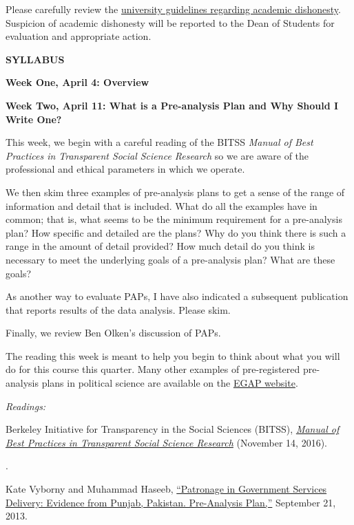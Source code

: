 \documentclass[11pt]{article}
\begin{document}
Please carefully review the \href{http://www.deanofstudents.ucla.edu/Portals/16/Documents/StudentGuide.pdf}{university guidelines regarding academic dishonesty}. 
Suspicion of academic dishonesty will be reported to the Dean of Students for evaluation and appropriate action.


\newpage
\centerline{\textbf{SYLLABUS}}


\textbf{Week One, April 4: Overview}

\textbf{Week Two, April 11: What is a Pre-analysis Plan and Why Should I Write One?}

This week, we begin with a careful reading of the BITSS \emph{Manual of Best Practices in Transparent Social Science Research} so we
are aware of the professional and ethical parameters in which we operate.  


We then skim three examples of pre-analysis plans to get a sense of the range of information and detail that is included. What do all the examples have in common; that is, what seems to be the minimum requirement for a
pre-analysis plan? How specific and detailed are the 
plans? Why do you think there is such a range in the amount of detail provided? How much detail do you think is
necessary to meet the underlying goals of a pre-analysis plan? What are these goals?

As another way to evaluate PAPs, I have also indicated a subsequent publication that reports results of the data analysis. Please skim.

Finally, we review Ben Olken's discussion of PAPs.

The reading this week is meant to help you begin to think about what you will do for this course this quarter. 
Many other examples of pre-registered pre-analysis plans in political science are available  
on the \href{http://egap.org/content/registration}{EGAP website}.


\textit{Readings:}


Berkeley Initiative for Transparency in the Social Sciences (BITSS),
\href{http://www.bitss.org/education/manual-of-best-practices/}{\emph{Manual of Best Practices in Transparent Social Science Research}} (November 14, 2016). 

\href{https://www.aeaweb.org/articles?id=10.1257/jep.29.3.61}{}.

Kate Vyborny and Muhammad Haseeb, \href{http://egap.org/registration/632}{``Patronage in Government Services Delivery: Evidence from Punjab, Pakistan. Pre-Analysis Plan,''} September 21, 2013.
\end{document}
